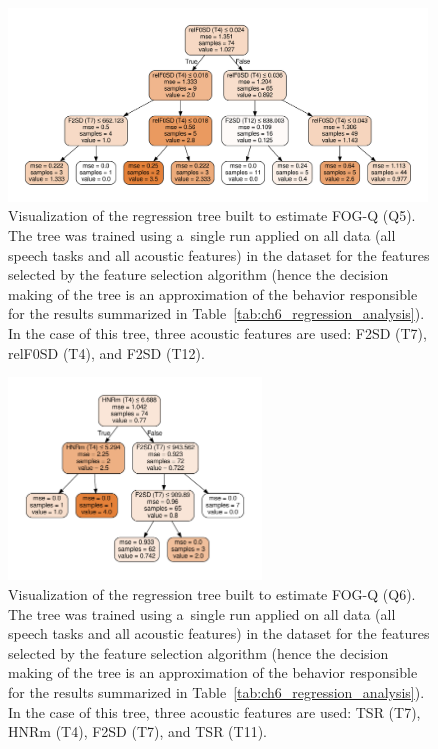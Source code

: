 \begin{figure}[htb!]
	\centering
	\scriptsize
	\includegraphics[width=0.99\textwidth]{pictures/ch6_tree_model_fogq5.pdf}
	\caption[Regression tree graph visualization for FOG-Q (Q5)]{Visualization of the regression tree built to estimate FOG-Q (Q5). The tree was trained using a~single run applied on all data (all speech tasks and all acoustic features) in the dataset for the features selected by the feature selection algorithm (hence the decision making of the tree is an approximation of the behavior responsible for the results summarized in Table~\ref{tab:ch6_regression_analysis}). In the case of this tree, three acoustic features are used: F2SD (T7), relF0SD (T4), and F2SD (T12).}
	\label{fig:ch6_regression_tree_fogq5}
\end{figure}

\begin{figure}[htb!]
	\centering
	\scriptsize
	\includegraphics[width=0.60\textwidth]{pictures/ch6_tree_model_fogq6.pdf}
	\caption[Regression tree graph visualization for FOG-Q (Q6)]{Visualization of the regression tree built to estimate FOG-Q (Q6). The tree was trained using a~single run applied on all data (all speech tasks and all acoustic features) in the dataset for the features selected by the feature selection algorithm (hence the decision making of the tree is an approximation of the behavior responsible for the results summarized in Table~\ref{tab:ch6_regression_analysis}). In the case of this tree, three acoustic features are used: TSR (T7), HNRm (T4), F2SD (T7), and TSR (T11).}
	\label{fig:ch6_regression_tree_fogq6}
\end{figure}

